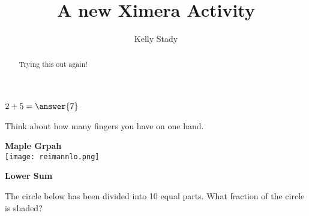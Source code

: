 \documentclass[handout]{ximera}
\title{A new Ximera Activity}
\author{Kelly Stady}
\begin{document}
\begin{abstract}
    Trying this out again!
\end{abstract}
\maketitle



\begin{question}
    $2+5=\answer{7}$

\begin{hint}  %
Think about how many fingers you have on one hand.
\end{hint}

\end{question}




\begin{center} %
\textbf{Maple Grpah} \\

    \texttt{[image: reimannlo.png]}

    \textbf{Lower Sum}
\end{center}


\begin{question}
 The circle below has been divided into 10 equal parts.  What fraction of the circle is shaded? \\ \\


\begin{center} 
\hspace{0.8in} 
\end{center}

\begin{multipleChoice}
\end{multipleChoice}

\end{question}
\end{document}
